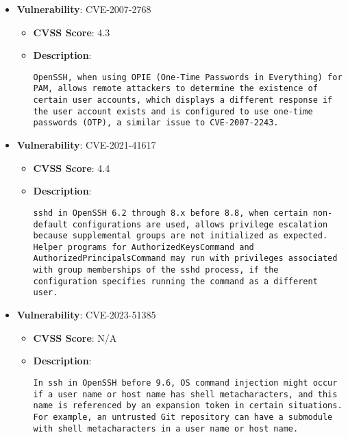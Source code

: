 \documentclass{article}
\begin{document}
\begin{itemize}
        \item \textbf{Vulnerability}: CVE-2007-2768
        \begin{itemize}
            \item \textbf{CVSS Score}:  4.3 
            \item \textbf{Description}:
            \parbox[t]{0.9\linewidth}{
                \verb|OpenSSH, when using OPIE (One-Time Passwords in Everything) for PAM, allows remote attackers to determine the existence of certain user accounts, which displays a different response if the user account exists and is configured to use one-time passwords (OTP), a similar issue to CVE-2007-2243.|
            }
        \end{itemize}
    
        \item \textbf{Vulnerability}: CVE-2021-41617
        \begin{itemize}
            \item \textbf{CVSS Score}:  4.4 
            \item \textbf{Description}:
            \parbox[t]{0.9\linewidth}{
                \verb|sshd in OpenSSH 6.2 through 8.x before 8.8, when certain non-default configurations are used, allows privilege escalation because supplemental groups are not initialized as expected. Helper programs for AuthorizedKeysCommand and AuthorizedPrincipalsCommand may run with privileges associated with group memberships of the sshd process, if the configuration specifies running the command as a different user.|
            }
        \end{itemize}
    
        \item \textbf{Vulnerability}: CVE-2023-51385
        \begin{itemize}
            \item \textbf{CVSS Score}:  N/A 
            \item \textbf{Description}:
            \parbox[t]{0.9\linewidth}{
                \verb|In ssh in OpenSSH before 9.6, OS command injection might occur if a user name or host name has shell metacharacters, and this name is referenced by an expansion token in certain situations. For example, an untrusted Git repository can have a submodule with shell metacharacters in a user name or host name.|
            }
        \end{itemize}
    

\end{itemize}
\end{document}
